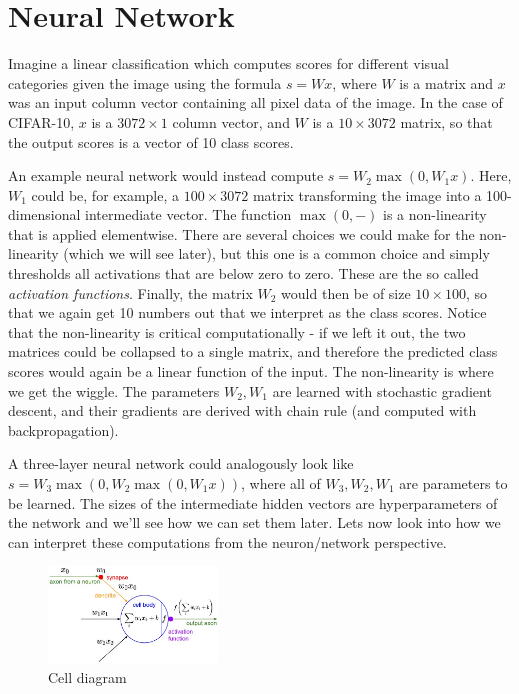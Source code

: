 \chapter{Neural Network}

Imagine a linear classification which computes scores for different visual categories given the image using the formula $s=Wx$, where $W$ is a matrix and $x$ was an input column vector containing all pixel data of the image. In the case of CIFAR-10, $x$ is a $3072 \times 1 $ column vector, and $W$ is a $10 \times 3072$ matrix, so that the output scores is a vector of 10 class scores.

An example neural network would instead compute $s=W_2\max(0,W_1x)$. Here, $W_1$ could be, for example, a $100 \times 3072$ matrix transforming the image into a 100-dimensional intermediate vector. The function $\max(0,-)$ is a non-linearity that is applied elementwise. There are several choices we could make for the non-linearity (which we will see later), but this one is a common choice and simply thresholds all activations that are below zero to zero. These are the so called \textit{activation functions}. Finally, the matrix $W_2$ would then be of size $10 \times 100$, so that we again get 10 numbers out that we interpret as the class scores. Notice that the non-linearity is critical computationally - if we left it out, the two matrices could be collapsed to a single matrix, and therefore the predicted class scores would again be a linear function of the input. The non-linearity is where we get the wiggle. The parameters $W_2,W_1$ are learned with stochastic gradient descent, and their gradients are derived with chain rule (and computed with backpropagation).

A three-layer neural network could analogously look like $s=W_3\max(0,W_2\max(0,W_1x))$, where all of $W_3,W_2,W_1$ are parameters to be learned. The sizes of the intermediate hidden vectors are hyperparameters of the network and we’ll see how we can set them later. Lets now look into how we can interpret these computations from the neuron/network perspective.

\begin{figure}[h]
  \centering
  \includegraphics[width=0.4\textwidth]{Images/nn/1.jpeg}
  \caption{Cell diagram}
\end{figure}

